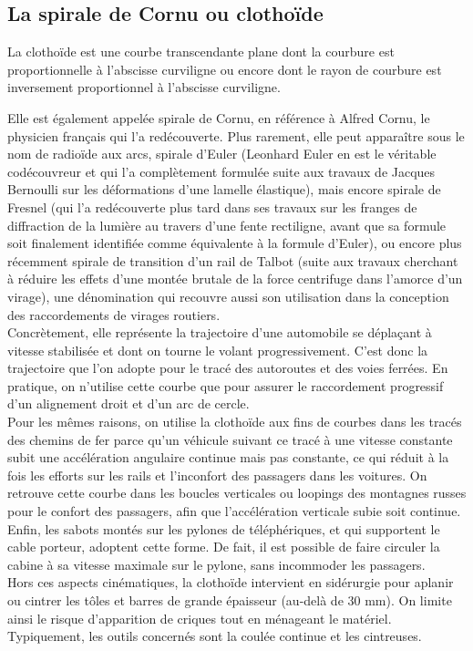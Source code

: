 \documentclass[a4paper,11pt]{book}
\begin{document}
\subsection{La spirale de Cornu ou clotho\"{i}de}
La clotho\"{i}de est une courbe transcendante plane dont la courbure est 
proportionnelle \`a l'abscisse curviligne ou encore dont le rayon de courbure 
est inversement proportionnel \`a l'abscisse curviligne.

Elle est \'egalement appel\'ee spirale de Cornu, en r\'ef\'erence \`a Alfred 
Cornu, le physicien fran\c{c}ais qui l'a red\'ecouverte. Plus rarement, elle 
peut apparaître sous le nom de radio\"{i}de aux arcs, spirale d'Euler 
(Leonhard Euler en est le v\'eritable cod\'ecouvreur et qui l'a compl\`etement 
formul\'ee suite aux travaux de Jacques Bernoulli sur les d\'eformations d'une 
lamelle \'elastique), mais encore spirale de Fresnel (qui l'a red\'ecouverte 
plus tard dans ses travaux sur les franges de diffraction de la lumi\`ere au 
travers d'une fente rectiligne, avant que sa formule soit finalement 
identifi\'ee comme \'equivalente \`a la formule d'Euler), ou encore plus 
r\'ecemment spirale de transition d'un rail de Talbot (suite aux travaux 
cherchant \`a r\'eduire les effets d'une mont\'ee brutale de la force 
centrifuge dans l'amorce d'un virage), une d\'enomination qui recouvre aussi 
son utilisation dans la conception des raccordements de virages routiers.\\
Concr\`etement, elle repr\'esente la trajectoire d'une automobile se 
d\'epla\c{c}ant \`a vitesse stabilis\'ee et dont on tourne le volant 
progressivement. C'est donc la trajectoire que l'on adopte pour le trac\'e des 
autoroutes et des voies ferr\'ees. En pratique, on n'utilise cette courbe que 
pour assurer le raccordement progressif d'un alignement droit et d'un arc de 
cercle. \\
Pour les m\^emes raisons, on utilise la clotho\"{i}de aux fins de courbes dans
les trac\'es des chemins de fer parce qu'un v\'ehicule suivant ce trac\'e \`a 
une vitesse constante subit une acc\'el\'eration angulaire continue mais pas 
constante, ce qui r\'eduit \`a la fois les efforts sur les rails et l'inconfort
 des passagers dans les voitures. On retrouve cette courbe dans les boucles 
verticales ou loopings des montagnes russes pour le confort des passagers, afin 
que l'acc\'el\'eration verticale subie soit continue.\\
Enfin, les sabots mont\'es sur les pylones de t\'el\'eph\'eriques, et qui 
supportent le cable porteur, adoptent cette forme. De fait, il est possible de 
faire circuler la cabine \`a sa vitesse maximale sur le pylone, sans incommoder
 les passagers.\\
Hors ces aspects cin\'ematiques, la clotho\"{i}de intervient en sid\'erurgie 
pour aplanir ou cintrer les t\^oles et barres de grande \'epaisseur (au-del\`a 
de 30 mm). On limite ainsi le risque d'apparition de criques tout en m\'enageant
le mat\'eriel. Typiquement, les outils concern\'es sont la coul\'ee continue et
les cintreuses.
\end{document}
